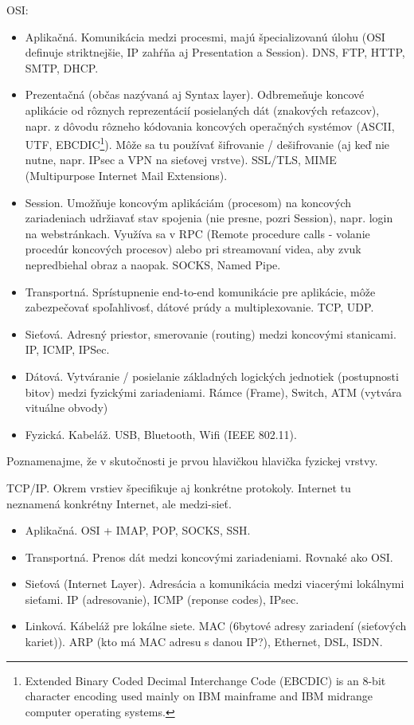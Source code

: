 OSI:
\begin{itemize}
\item Aplikačná. Komunikácia medzi procesmi, majú špecializovanú úlohu (OSI definuje striktnejšie, IP zahŕňa aj Presentation a Session). DNS, FTP, HTTP, SMTP, DHCP. 
\item Prezentačná (občas nazývaná aj Syntax layer). Odbremeňuje koncové aplikácie od rôznych reprezentácií posielaných dát (znakových reťazcov),
napr. z dôvodu rôzneho kódovania koncových operačných systémov (ASCII, UTF, EBCDIC\footnote{
Extended Binary Coded Decimal Interchange Code (EBCDIC) is an 8-bit character encoding used mainly on IBM mainframe and IBM midrange computer operating systems.
}). Môže sa tu používať šifrovanie / dešifrovanie (aj keď nie nutne, napr. IPsec a VPN na sieťovej vrstve). SSL/TLS, MIME (Multipurpose Internet Mail Extensions).        
\item Session. Umožňuje koncovým aplikáciám (procesom) na koncových zariadeniach udržiavať stav spojenia (nie presne, pozri Session), napr. login na webstránkach. Využíva sa v RPC (Remote procedure calls - volanie procedúr koncových procesov) alebo pri streamovaní videa, aby zvuk nepredbiehal obraz a naopak. SOCKS, Named Pipe. 
\item Transportná. Sprístupnenie end-to-end komunikácie pre aplikácie, môže zabezpečovať spoľahlivosť, dátové prúdy a multiplexovanie. TCP, UDP.                    
\item Sieťová. Adresný priestor, smerovanie (routing) medzi koncovými stanicami. IP, ICMP, IPSec. 
\item Dátová. Vytváranie / posielanie základných logických jednotiek (postupnosti bitov) medzi fyzickými zariadeniami. Rámce (Frame), Switch, ATM (vytvára vituálne obvody)
\item Fyzická. Kabeláž. USB, Bluetooth, Wifi (IEEE 802.11).
\end{itemize}

Poznamenajme, že v skutočnosti je prvou hlavičkou hlavička fyzickej vrstvy. 

TCP/IP. Okrem vrstiev špecifikuje aj konkrétne protokoly. Internet tu neznamená konkrétny Internet, ale medzi-sieť.   
\begin{itemize}
\item Aplikačná. OSI + IMAP, POP, SOCKS, SSH.            
\item Transportná. Prenos dát medzi koncovými zariadeniami. Rovnaké ako OSI.     
\item Sieťová (Internet Layer). Adresácia a komunikácia medzi viacerými lokálnymi sieťami. IP (adresovanie), ICMP (reponse codes), IPsec.      
\item Linková. Kábeláž pre lokálne siete. MAC (6bytové adresy zariadení (sieťových kariet)). ARP (kto má MAC adresu s danou IP?), Ethernet, DSL, ISDN.      
\end{itemize}

